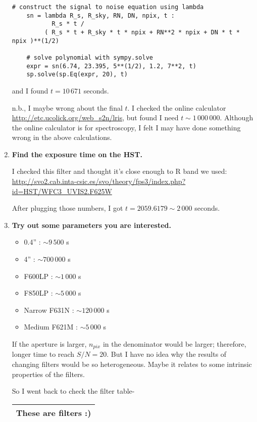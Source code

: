 \documentclass[12pt,letterpaper]{article}
\begin{document}
\begin{enumerate}
\begin{lstlisting}[style = python]
    # construct the signal to noise equation using lambda
    sn = lambda R_s, R_sky, RN, DN, npix, t : 
           R_s * t /
         ( R_s * t + R_sky * t * npix + RN**2 * npix + DN * t * npix )**(1/2)    
        
    # solve polynomial with sympy.solve
    expr = sn(6.74, 23.395, 5**(1/2), 1.2, 7**2, t)
    sp.solve(sp.Eq(expr, 20), t)
    \end{lstlisting} 

    and I found $t = 10\,671$ seconds.

    n.b., I maybe wrong about the final $t$. I checked the online 
    calculator \url{http://etc.ucolick.org/web_s2n/lris}, but 
    found I need $t \sim 1\,000\,000$. Although the online calculator 
    is for spectroscopy, I felt I may have done something wrong 
    in the above calculations. 

    \item {\bf Find the exposure time on the HST.}
    
    I checked this filter and thought it's close enough to R band we used:
    \url{http://svo2.cab.inta-csic.es/svo/theory/fps3/index.php?id=HST/WFC3_UVIS2.F625W}
    
    After plugging those numbers, I got $t = 2059.6179 \sim 2\,000$ seconds. 
    
    \item {\bf Try out some parameters you are interested.}
    
    \begin{itemize}
        \item  0.4'' : $\sim 9\,500$ s
        \item 4''    : $\sim 700\,000$ s
        \item F600LP : $\sim 1\,000$ s
        \item F850LP  : $\sim 5\,000$ s
        \item Narrow F631N : $\sim 120\,000$ s
        \item Medium F621M : $\sim 5\,000$ s
    \end{itemize}

    If the aperture is larger, $n_{pix}$ in the denominator would be larger;
    therefore, longer time to reach $S/N = 20$.
    But I have no idea why the results of changing filters
    would be so heterogeneous.
    Maybe it relates to some intrinsic properties of the filters.
    
    So I went back to check the filter table-

    \begin{tabular}{ |p{3cm} || p{3cm}|p{3cm}|p{3cm}| }
        \hline
        \multicolumn{4}{|c|}{These are filters :)} \\
        \hline


\end{tabular}
\end{enumerate}
\end{document}
